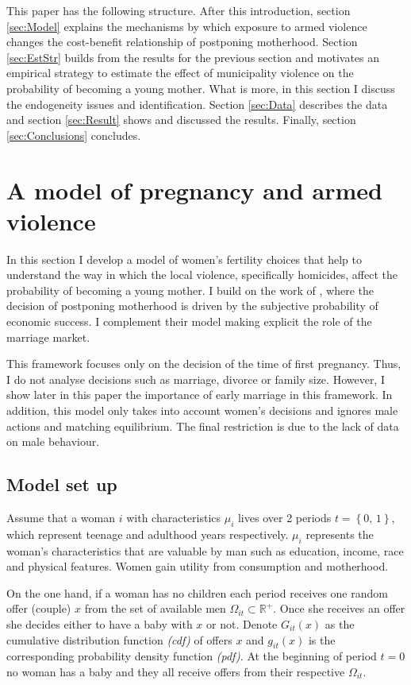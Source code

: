 \documentclass[a4paper,10pt,twocolumn,preprint,3p,authoryear]{elsarticle}
\begin{document}
This paper has the following structure. After this introduction, section \ref{sec:Model}  explains the mechanisms by which exposure to armed violence changes the cost-benefit relationship of postponing motherhood. Section \ref{sec:EstStr} builds from the results for the previous section and motivates an empirical strategy to estimate the effect of municipality violence on the probability of becoming a young mother. What is more, in this section I discuss the endogeneity issues and identification. Section \ref{sec:Data} describes the data and section \ref{sec:Result} shows and discussed the results. Finally, section \ref{sec:Conclusions} concludes. 

\section{A model of pregnancy and armed violence\label{sec:Model}}

In this section I develop a model of women's fertility choices that help to understand the way in which the local violence, specifically homicides, affect the probability of becoming a young mother. I build on the work of \citet{KearneyLevine2011}, where the decision of postponing motherhood is driven by the subjective probability of economic success. I complement their model making explicit the role of the marriage market.

This framework focuses only on the decision of the time of first pregnancy. Thus, I do not analyse decisions such as marriage, divorce or family size. However, I show later in this paper the importance of early marriage in this framework. In addition, this model only takes into account women's decisions and ignores male actions and matching equilibrium. The final restriction is due to the lack of data on male behaviour.

\subsection{Model set up}

Assume that a woman $i$ with characteristics $\mu_{i}$ lives over 2 periods $t=\left\{ 0,\,1\right\}$, which represent teenage and adulthood years respectively. $\mu_{i}$ represents the woman's characteristics that are valuable by man such as education, income, race and physical features. Women gain utility from consumption and motherhood.   

On the one hand, if a woman has no children each period receives one random offer (couple) $x$ from the set of available men $\Omega_{it} \subset \mathbb{R}^{+}$. Once she receives an offer she decides either to have a baby with $x$ or not. Denote $G_{it}\left(x \right)$ as the cumulative distribution function \emph{(cdf)} of offers $x$ and $g_{it}\left(x\right)$ is the corresponding probability density function \emph{(pdf)}. At the beginning of period $t=0$ no woman has a baby and they all receive offers from their respective $\Omega_{it}$.
\end{document}
